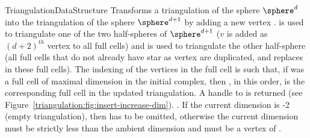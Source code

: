 \begin{ccRefConcept}{TriangulationDataStructure}
{Transforms a triangulation of  the sphere $\sphere^d$ into the
triangulation of the sphere $\sphere^{d+1}$ by adding a new vertex
.
 is used to triangulate one of the two half-spheres of
$\sphere^{d+1}$ ($v$ is added as $(d+2)^{th}$ vertex to all
full cells)
and  is used to triangulate the other half-sphere
(all full cells that do not already have star as vertex are duplicated,
and  replaces  in these full cells).
The indexing of the vertices in the
full cell is such that, if  was a full cell of maximal dimension in the
initial complex, then , in this order, is the corresponding full cell
in the updated triangulation. A handle to  is returned
(see Figure~\ref{triangulation:fig:insert-increase-dim}).
\ccPrecond\ccVar.
If the current dimension is -2 (empty triangulation), then 
has to be omitted, otherwise
the current dimension must be strictly less than the ambient dimension
and  must be a vertex of \ccVar.}


\end{ccRefConcept}
